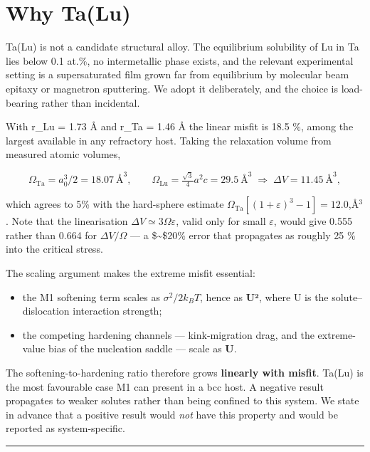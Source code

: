\hypertarget{why-talu}{%
\section{Why Ta(Lu)}\label{sec:why-talu}}

Ta(Lu) is not a candidate structural alloy. The equilibrium solubility of Lu in Ta lies below 0.1 at.\%, no intermetallic phase exists, and the relevant experimental setting is a supersaturated film grown far from equilibrium by molecular beam epitaxy or magnetron sputtering. We adopt it deliberately, and the choice is load-bearing rather than incidental.

With r\_Lu = 1.73 Å and r\_Ta = 1.46 Å the linear misfit is 18.5 \%, among the largest available in any refractory host. Taking the relaxation volume from measured atomic volumes,

\[\Omega_{\mathrm{Ta}} = a_0^3/2 = 18.07\ \text{\AA}^3,\qquad \Omega_{\mathrm{Lu}} = \tfrac{\sqrt{3}}{4}a^2c = 29.5\ \text{\AA}^3 \;\Longrightarrow\; \Delta V = 11.45\ \text{\AA}^3,\]

which agrees to 5\% with the hard-sphere estimate \(\Omega_{\mathrm{Ta}}[(1+\varepsilon)^3-1] = 12.0\),\AA\(^3\). Note that the linearisation \(\Delta V \simeq 3\Omega\varepsilon\), valid only for small \(\varepsilon\), would give 0.555 rather than 0.664 for \(\Delta V/\Omega\) --- a \$\sim\$20\% error that propagates as roughly 25 \% into the critical stress.

The scaling argument makes the extreme misfit essential:

\begin{itemize}
\tightlist
\item
  the M1 softening term scales as \(\sigma^2/2k_BT\), hence as \textbf{U²}, where U is the solute--dislocation interaction strength;
\item
  the competing hardening channels --- kink-migration drag, and the extreme-value bias of the nucleation saddle --- scale as \textbf{U}.
\end{itemize}

The softening-to-hardening ratio therefore grows \textbf{linearly with misfit}. Ta(Lu) is the most favourable case M1 can present in a bcc host. A negative result propagates to weaker solutes rather than being confined to this system. We state in advance that a positive result would \emph{not} have this property and would be reported as system-specific.

\begin{center}\rule{0.5\linewidth}{0.5pt}\end{center}

